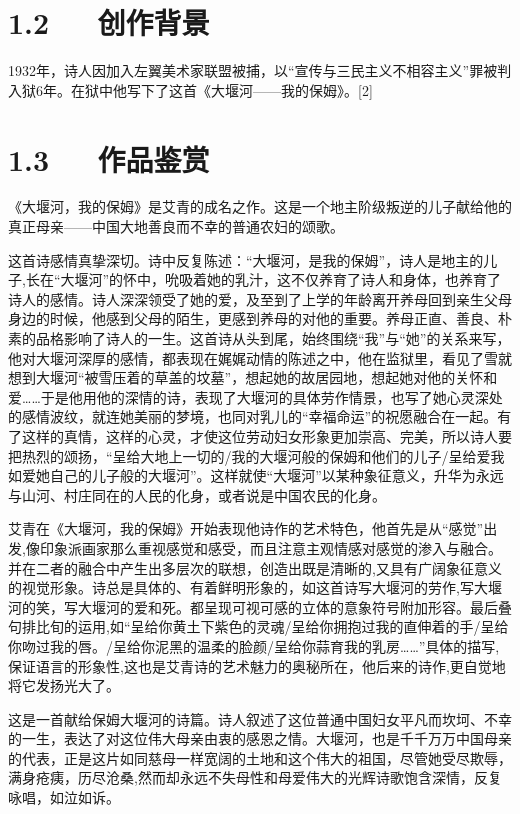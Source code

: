 \documentclass[letterpaper,12pt,english]{sphinxmanual}
\begin{document}
\section{1.2   创作背景}
\label{\detokenize{p01_u6563_u6587/_u827e_u9752-_u5927_u5830_u6cb3_u2014_u2014_u6211_u7684_u4fdd_u59c6:id4}}
1932年，诗人因加入左翼美术家联盟被捕，以“宣传与三民主义不相容主义”罪被判入狱6年。在狱中他写下了这首《大堰河——我的保姆》。{[}2{]}


\section{1.3   作品鉴赏}
\label{\detokenize{p01_u6563_u6587/_u827e_u9752-_u5927_u5830_u6cb3_u2014_u2014_u6211_u7684_u4fdd_u59c6:id5}}
《大堰河，我的保姆》是艾青的成名之作。这是一个地主阶级叛逆的儿子献给他的真正母亲——中国大地善良而不幸的普通农妇的颂歌。

这首诗感情真挚深切。诗中反复陈述：“大堰河，是我的保姆”，诗人是地主的儿子,长在“大堰河”的怀中，吮吸着她的乳汁，这不仅养育了诗人和身体，也养育了诗人的感情。诗人深深领受了她的爱，及至到了上学的年龄离开养母回到亲生父母身边的时候，他感到父母的陌生，更感到养母的对他的重要。养母正直、善良、朴素的品格影响了诗人的一生。这首诗从头到尾，始终围绕“我”与“她”的关系来写，他对大堰河深厚的感情，都表现在娓娓动情的陈述之中，他在监狱里，看见了雪就想到大堰河“被雪压着的草盖的坟墓”，想起她的故居园地，想起她对他的关怀和爱……于是他用他的深情的诗，表现了大堰河的具体劳作情景，也写了她心灵深处的感情波纹，就连她美丽的梦境，也同对乳儿的“幸福命运”的祝愿融合在一起。有了这样的真情，这样的心灵，才使这位劳动妇女形象更加崇高、完美，所以诗人要把热烈的颂扬，“呈给大地上一切的/我的大堰河般的保姆和他们的儿子/呈给爱我如爱她自己的儿子般的大堰河”。这样就使“大堰河”以某种象征意义，升华为永远与山河、村庄同在的人民的化身，或者说是中国农民的化身。

艾青在《大堰河，我的保姆》开始表现他诗作的艺术特色，他首先是从“感觉”出发,像印象派画家那么重视感觉和感受，而且注意主观情感对感觉的渗入与融合。并在二者的融合中产生出多层次的联想，创造出既是清晰的,又具有广阔象征意义的视觉形象。诗总是具体的、有着鲜明形象的，如这首诗写大堰河的劳作,写大堰河的笑，写大堰河的爱和死。都呈现可视可感的立体的意象符号附加形容。最后叠句排比旬的运用,如“呈给你黄土下紫色的灵魂/呈给你拥抱过我的直伸着的手/呈给你吻过我的唇。/呈给你泥黑的温柔的脸颜/呈给你蒜育我的乳房……”具体的描写,保证语言的形象性,这也是艾青诗的艺术魅力的奥秘所在，他后来的诗作,更自觉地将它发扬光大了。

这是一首献给保姆大堰河的诗篇。诗人叙述了这位普通中国妇女平凡而坎坷、不幸的一生，表达了对这位伟大母亲由衷的感恩之情。大堰河，也是千千万万中国母亲的代表，正是这片如同慈母一样宽阔的土地和这个伟大的祖国，尽管她受尽欺辱，满身疮痍，历尽沧桑,然而却永远不失母性和母爱伟大的光辉诗歌饱含深情，反复咏唱，如泣如诉。
\end{document}
